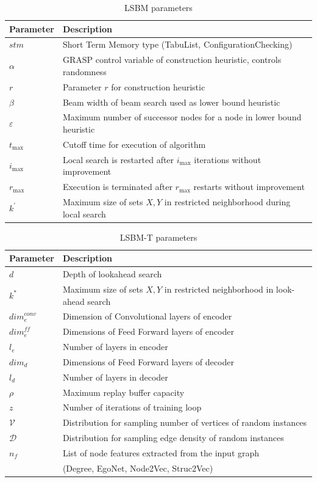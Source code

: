 \documentclass[draft,final]{vutinfth} %
\begin{document}
\begin{table}
    \centering
    \begin{tabular}{ll}
        \hline
        Parameter & Description \\ \hline
        $\mathit{stm}$ & Short Term Memory type (TabuList, ConfigurationChecking) \\
        $\alpha$ & GRASP control variable of construction heuristic, controls randomness \\
        $r$ & Parameter $r$ for construction heuristic \\
        $\beta$ & Beam width of beam search used as lower bound heuristic \\
        $\varepsilon$ & Maximum number of successor nodes for a node in lower bound heuristic \\
        $t_{\max}$ & Cutoff time for execution of algorithm \\
        $i_{\max}$ & Local search is restarted after $i_{\max}$ iterations without improvement \\
        $r_{\max}$ & Execution is terminated after $r_{\max}$ restarts without improvement \\
        $k^\prime$ & Maximum size of sets $X, Y$ in restricted neighborhood during local search 
    \end{tabular}
    \caption{LSBM parameters}
    \label{tab:parameters-lsbm}
\end{table}

\begin{table}
    \centering
    \begin{tabular}{ll}
        \hline
        Parameter & Description \\ \hline
        $d$ & Depth of lookahead search \\
        $k^*$ & Maximum size of sets $X,Y$ in restricted neighborhood in look-ahead search \\
        $\mathit{dim}^{\mathit{conv}}_e$ & Dimension of Convolutional layers of encoder \\
        $\mathit{dim}^{\mathit{ff}}_e$ & Dimensions of Feed Forward layers of encoder \\
        $l_e$ & Number of layers in encoder \\
        $\mathit{dim}_d$ & Dimensions of Feed Forward layers of decoder \\
        $l_d$ & Number of layers in decoder \\
        $\rho$ & Maximum replay buffer capacity \\
        $z$ & Number of iterations of training loop \\
        $\mathcal{V}$ & Distribution for sampling number of vertices of random instances \\
        $\mathcal{D}$ & Distribution for sampling edge density of random instances \\
        $n_f$ & List of node features extracted from the input graph  \\
        & (Degree, EgoNet, Node2Vec, Struc2Vec)
    \end{tabular}
    \caption{LSBM-T parameters}
    \label{tab:parameters-lsbm-t}
\end{table}
\end{document}
